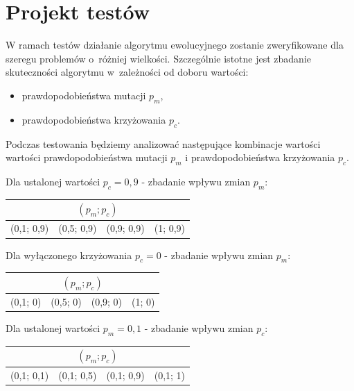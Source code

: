 \documentclass[12pt, a4paper]{article}
\begin{document}
\section{Projekt testów}
W ramach testów działanie algorytmu ewolucyjnego zostanie zweryfikowane dla szeregu problemów o~różniej wielkości. Szczególnie istotne jest zbadanie skuteczności algorytmu w~zależności od doboru wartości:
\begin{itemize}
	\item prawdopodobieństwa mutacji $p_m$,
	\item prawdopodobieństwa krzyżowania $p_c$.
\end{itemize}

Podczas testowania będziemy analizować następujące kombinacje wartości wartości prawdopodobieństwa mutacji $p_m$ i prawdopodobieństwa krzyżowania $p_c$.

\bigskip

Dla ustalonej wartości $p_c = 0,9$ - zbadanie wpływu zmian $p_m$:
\begin{center}
\begin{tabular}{|l|l|l|l|}
\hline
\multicolumn{4}{|c|}{$(p_m; p_c)$} \\
\hline
(0,1; 0,9) & (0,5; 0,9) & (0,9; 0,9) & (1; 0,9)\\
\hline
\end{tabular}
\end{center}

\bigskip

Dla wyłączonego krzyżowania $p_c = 0$ - zbadanie wpływu zmian $p_m$:
\begin{center}
\begin{tabular}{|l|l|l|l|}
\hline
\multicolumn{4}{|c|}{$(p_m; p_c)$} \\
\hline
(0,1; 0) & (0,5; 0) & (0,9; 0) & (1; 0)\\
\hline
\end{tabular}
\end{center}

\bigskip

Dla ustalonej wartości $p_m = 0,1$ - zbadanie wpływu zmian $p_c$:
\begin{center}
\begin{tabular}{|l|l|l|l|}
\hline
\multicolumn{4}{|c|}{$(p_m; p_c)$} \\
\hline
(0,1; 0,1) & (0,1; 0,5) & (0,1; 0,9) & (0,1; 1)\\
\hline
\end{tabular}
\end{center}
\end{document}
